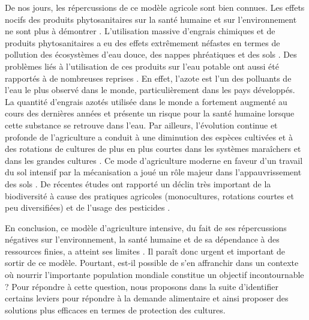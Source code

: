 	De nos jours, les répercussions de ce modèle agricole sont bien connues.
Les effets nocifs   des produits phytosanitaires sur la santé humaine et sur l’environnement ne sont plus  à démontrer \citep{Tilman2011, Nicolopoulou-stamati2016}.  L’utilisation massive d’engrais chimiques et  de produits phytosanitaires a eu des effets extrêmement néfastes en termes de pollution des écosystèmes d’eau douce, des nappes phréatiques et des sols \citep{Tilman1999, Stoate2001, Moss2008, Tilman2011}.
Des problèmes liés à l'utilisation de ces produits sur  l'eau potable ont aussi été rapportés à  de nombreuses reprises \citep{Tilman1999, Carpenter1998}. En effet, l’azote est l’un des polluants de l’eau le plus observé dans le monde, particulièrement dans les pays développés. La quantité d’engrais azotés utilisée dans le monde a fortement augmenté au cours des  dernières années \citep{Tilman1999} et présente  un risque pour la santé humaine lorsque cette substance  se retrouve dans l'eau.
	Par ailleurs, l'évolution continue et profonde de l'agriculture a conduit à une diminution des espèces cultivées et à des rotations de cultures de plus en plus courtes dans les systèmes maraîchers et dans les grandes cultures \citep{Bennett2012, Zhan2015}. Ce mode d'agriculture moderne en faveur d'un travail du  sol  intensif par la mécanisation  a joué un rôle majeur dans l'appauvrissement des sols  \citep{Matson1997}.
	De récentes études ont rapporté  un déclin très important de la  biodiversité à cause des pratiques agricoles (monocultures, rotations courtes et peu diversifiées) et de l'usage des pesticides  \citep{Ceballos2017, Geiger2010, Potts2010, Seibold2019, Bommarco2013}. %

	En conclusion, ce modèle d’agriculture intensive, du fait de ses répercussions négatives
sur l’environnement, la santé humaine et de sa dépendance à des ressources finies, a atteint ses limites \citep{Tilman2002}. Il paraît donc urgent et important de sortir de ce modèle.
Pourtant, est-il possible de s'en affranchir dans un contexte où nourrir l'importante population mondiale  constitue un objectif incontournable \citep{Movahedi2009} ?   Pour répondre à cette question, nous proposons dans la suite d'identifier certains  leviers  pour répondre à la demande alimentaire et ainsi proposer des solutions plus efficaces en termes de protection des cultures.
	 
